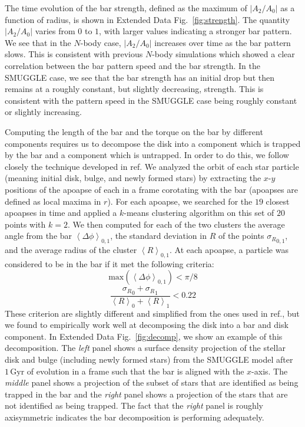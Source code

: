 \documentclass{natureprintstyle}
\newcommand{\Nbody}{$N$-body}
\begin{document}
The time evolution of the bar strength, defined as the maximum of
$\left|A_2/A_0\right|$ as a function of radius, is shown in Extended Data
Fig.~\ref{fig:strength}. The quantity $\left|A_2/A_0\right|$ varies from $0$
to $1$, with larger values indicating a stronger bar pattern. We see that in
the \Nbody{} case, $\left|A_2/A_0\right|$ increases over time as the bar pattern
slows. This is consistent with previous \Nbody{} simulations which showed a
clear correlation between the bar pattern speed and the bar
strength.\cite{2003MNRAS.341.1179A} In the SMUGGLE case, we see that the bar
strength has an initial drop but then remains at a roughly constant, but
slightly decreasing, strength. This is consistent with the pattern speed in the
SMUGGLE case being roughly constant or slightly increasing.

Computing the length of the bar and the torque on the bar by different
components requires us to decompose the disk into a component which is trapped
by the bar and a component which is untrapped. In order to do this, we follow
closely the technique developed in ref.\cite{2016MNRAS.463.1952P} We analyzed
the orbit of each star particle (meaning initial disk, bulge, and newly formed
stars) by extracting the $x$-$y$ positions of the apoapse of each in a frame
corotating with the bar (apoapses are defined as local maxima in $r$). For
each apoapse, we searched for the $19$ closest apoapses in time and applied a
$k$-means clustering algorithm on this set of $20$ points with $k=2$. We then
computed for each of the two clusters the average angle from the bar
$\left<\Delta \phi\right>_{0,1}$, the standard deviation in $R$ of the points
${\sigma_R}_{0,1}$, and the average radius of the cluster
$\left<R\right>_{0,1}$. At each apoapse, a particle was considered to be in
the bar if it met the following criteria:
\begin{equation}
\textrm{max}\left(\left<\Delta \phi\right>_{0,1}\right) < \pi / 8
\end{equation}
\begin{equation}
\frac{{\sigma_R}_0 + {\sigma_R}_1}{\left<R\right>_0 + \left<R\right>_1} < 0.22
\end{equation}
These criterion are slightly different and simplified from the ones used in
ref.\cite{2016MNRAS.463.1952P}, but we found to empirically work well at
decomposing the disk into a bar and disk component. In Extended Data
Fig.~\ref{fig:decomp}, we show an example of this decomposition. The
\textit{left} panel shows a surface density projection of the stellar disk and
bulge (including newly formed stars) from the SMUGGLE model after
$1\,\text{Gyr}$ of evolution in a frame such that the bar is aligned with the
$x$-axis. The \textit{middle} panel shows a projection of the subset of stars
that are identified as being trapped in the bar and the \textit{right} panel
shows a projection of the stars that are not identified as being trapped. The
fact that the \textit{right} panel is roughly axisymmetric indicates the bar
decomposition is performing adequately.
\end{document}
